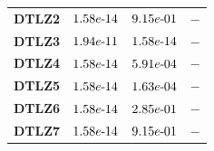 \documentclass{article}
\begin{document}
\begin{table}[!htp]
\begin{tiny}
\begin{tabular}{c|ccc}
\textbf{DTLZ2} & $\cellcolor{gray25} 1.58e\makebox[0.1cm]{-}14 $ & $ 9.15e\makebox[0.1cm]{-}01 $ & $ -$ \\
\textbf{DTLZ3} & $\cellcolor{gray25} 1.94e\makebox[0.1cm]{-}11 $ & $ \cellcolor{gray25} 1.58e\makebox[0.1cm]{-}14 $ & $ -$ \\
\textbf{DTLZ4} & $\cellcolor{gray25} 1.58e\makebox[0.1cm]{-}14 $ & $ \cellcolor{gray25} 5.91e\makebox[0.1cm]{-}04 $ & $ -$ \\
\textbf{DTLZ5} & $\cellcolor{gray25} 1.58e\makebox[0.1cm]{-}14 $ & $ \cellcolor{gray25} 1.63e\makebox[0.1cm]{-}04 $ & $ -$ \\
\textbf{DTLZ6} & $\cellcolor{gray25} 1.58e\makebox[0.1cm]{-}14 $ & $ 2.85e\makebox[0.1cm]{-}01 $ & $ -$ \\
\textbf{DTLZ7} & $\cellcolor{gray25} 1.58e\makebox[0.1cm]{-}14 $ & $ 9.15e\makebox[0.1cm]{-}01 $ & $ -$ \\
  \hline
  \end{tabular}
  \end{tiny}
\end{table}
\end{document}
